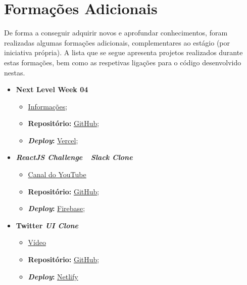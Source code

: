 \section{Formações Adicionais}

De forma a conseguir adquirir novos e aprofundar conhecimentos, foram realizadas algumas formações adicionais, complementares ao estágio (por iniciativa própria). A lista que se segue apresenta projetos realizados durante estas formações, bem como as respetivas ligações para o código desenvolvido nestas.

\clearpage

\begin{minipage}[t]{0.45\textwidth}
	\begin{itemize}
		\item \textbf{Next Level Week 04}
			\begin{itemize}
				\item \href{http://nextlevelweek.com/}{Informações};
				\item \textbf{Repositório:} \href{https://github.com/TutoDS/nlw04-react}{GitHub};
				\item \textbf{\textit{Deploy}:} \href{https://move-it-tutods.vercel.app}{Vercel};
			\end{itemize}

		\item \textbf{\textit{ReactJS Challenge~\textemdash~Slack Clone}}
			\begin{itemize}
				\item \href{https://www.youtube.com/channel/UCqrILQNl5Ed9Dz6CGMyvMTQ}{Canal do YouTube}
				\item \textbf{Repositório:} \href{https://github.com/TutoDS/reactjs-slack-clone-challenge}{GitHub};
				\item \textbf{\textit{Deploy}:} \href{https://slack-clone-challenge-c35ca.web.app/}{Firebase};
			\end{itemize}

			\item \textbf{Twitter \textit{UI Clone}}
			\begin{itemize}
				\item \href{https://www.youtube.com/watch?v=K-8z_4xvT3o}{Vídeo}
				\item \textbf{Repositório:} \href{https://github.com/TutoDS/twitter-ui-clone}{GitHub};
				\item \textbf{\textit{Deploy}:} \href{https://twitter-clone-tutods.netlify.app/}{Netlify}
			\end{itemize}
	\end{itemize}
\end{minipage}
